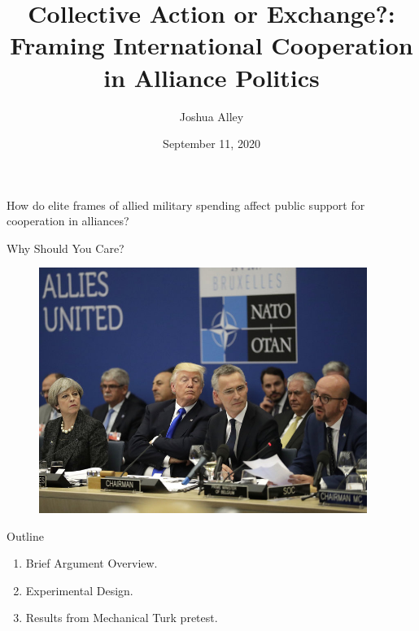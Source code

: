 \documentclass[12pt]{beamer}
\title{Collective Action or Exchange?: Framing International Cooperation in Alliance Politics}
\date{September 11, 2020}
\author{Joshua Alley}
\institute{University of Virginia}
\begin{document}
 \maketitle



 \begin{frame}[standout]

How do elite frames of allied military spending affect public support for cooperation in alliances? 

 \end{frame}
 


\begin{frame}{Why Should You Care?}

\begin{figure}[htbp]
		\includegraphics[width=0.95\textwidth]{trump-nato.jpg}
	\label{fig:trump-nato}
\end{figure}


\end{frame}


\begin{frame}{Outline}

\pause
\begin{enumerate}
\item Brief Argument Overview.
\pause
\item Experimental Design. 
\pause
\item Results from Mechanical Turk pretest. 
\end{enumerate}


\end{frame}
 
\end{document}
